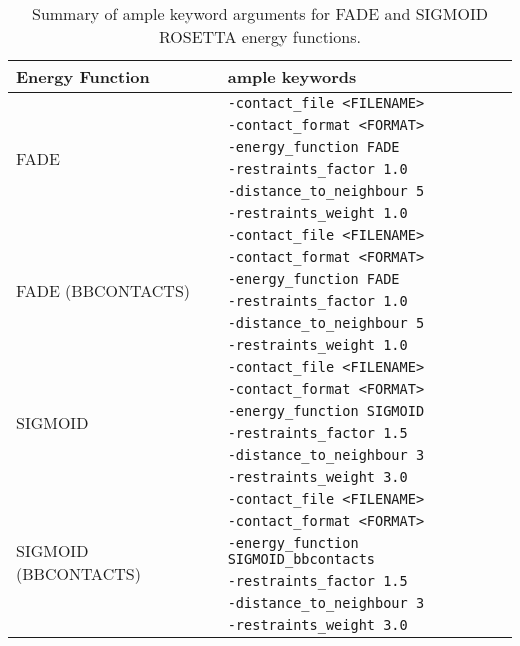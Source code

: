 \begin{table}[H]
    \centering
	\caption{Summary of \gls{ample} keyword arguments for FADE and SIGMOID ROSETTA energy functions.}
    \label{table:ample_predictors_kwargs}
    \begin{tabularx}{\textwidth}{ X X }
        \hline
        \textbf{Energy Function} & \textbf{\gls{ample} keywords} \\
        \hline
        \multirow{6}{1em}{FADE} & \texttt{-contact\_file <FILENAME>} \\
                                & \texttt{-contact\_format <FORMAT>} \\
                                & \texttt{-energy\_function FADE} \\
                                & \texttt{-restraints\_factor 1.0} \\
                                & \texttt{-distance\_to\_neighbour 5} \\
                                & \texttt{-restraints\_weight 1.0} \\
        \hline
        \multirow{6}{1em}{FADE (BBCONTACTS)} & \texttt{-contact\_file <FILENAME>} \\
                                & \texttt{-contact\_format <FORMAT>} \\
                                & \texttt{-energy\_function FADE} \\
                                & \texttt{-restraints\_factor 1.0} \\
                                & \texttt{-distance\_to\_neighbour 5} \\
                                & \texttt{-restraints\_weight 1.0} \\
        \hline
        \multirow{6}{1em}{SIGMOID} & \texttt{-contact\_file <FILENAME>} \\
                                & \texttt{-contact\_format <FORMAT>} \\
                                & \texttt{-energy\_function SIGMOID} \\
                                & \texttt{-restraints\_factor 1.5} \\
                                & \texttt{-distance\_to\_neighbour 3} \\
                                & \texttt{-restraints\_weight 3.0} \\
        \hline
        \multirow{6}{1em}{SIGMOID (BBCONTACTS)} & \texttt{-contact\_file <FILENAME>} \\
                                & \texttt{-contact\_format <FORMAT>} \\
                                & \texttt{-energy\_function SIGMOID\_bbcontacts} \\
                                & \texttt{-restraints\_factor 1.5} \\
                                & \texttt{-distance\_to\_neighbour 3} \\
                                & \texttt{-restraints\_weight 3.0} \\
        \hline
    \end{tabularx}
\end{table}

